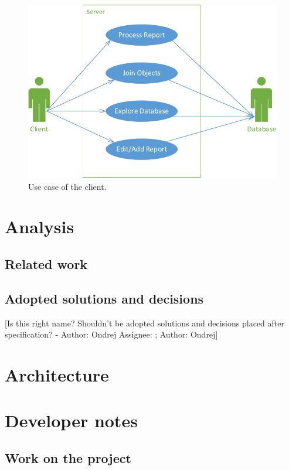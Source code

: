 \documentclass[12pt,a4paper]{report}
\makeatletter
\newcommand{\comment}[3][\@empty]{
  {\color{magenta}[#3 - }
  {\color{green}\ifx\@empty#1\relax Author: #2 \else Assignee: #1; Author: #2\fi}{\color{magenta}]}
}
\makeatother
\begin{document}
\begin{figure}[!htb]
        \centering
        \includegraphics[width=\textwidth]{Images/UseCase2}
        \caption{Use case of the client.}
        \label{fig:UseCase2}
\end{figure}

\chapter{Analysis}

\section{Related work}


\section{Adopted solutions and decisions}
\comment{Ondrej}{Is this right name? Shouldn't be adopted solutions and decisions placed after specification?}


\chapter{Architecture}


\chapter{Developer notes}
\section{Work on the project}

\end{document}
